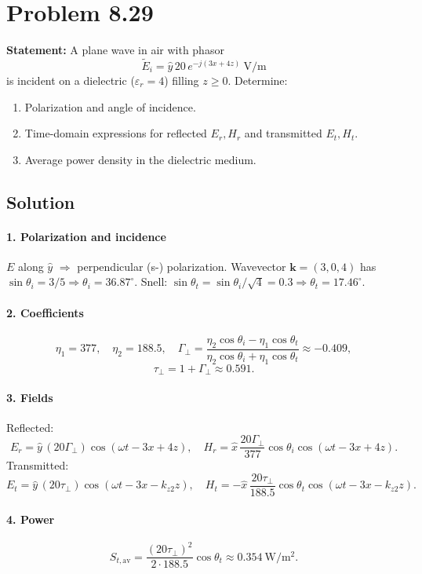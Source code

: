 \section*{Problem 8.29}
\textbf{Statement:} A plane wave in air with phasor
\[
\tilde E_i = \hat y\,20\,e^{-j(3x + 4z)}\ \mathrm{V/m}
\]
is incident on a dielectric ($\varepsilon_r=4$) filling $z\ge0$. Determine:
\begin{enumerate}
  \item Polarization and angle of incidence.
  \item Time-domain expressions for reflected $E_r,H_r$ and transmitted $E_t,H_t$.
  \item Average power density in the dielectric medium.
\end{enumerate}

\subsection*{Solution}
\paragraph{1. Polarization and incidence}
$E$ along $\hat y$ $\Rightarrow$ perpendicular (s-) polarization.  
Wavevector $\mathbf{k}=(3,0,4)$ has $\sin\theta_i=3/5\Rightarrow \theta_i=36.87^\circ$.  
Snell: $\sin\theta_t=\sin\theta_i/\sqrt{4}=0.3\Rightarrow \theta_t=17.46^\circ$.

\paragraph{2. Coefficients}
\[
\eta_1=377,\quad\eta_2=188.5,\quad
\Gamma_\perp = \frac{\eta_2\cos\theta_i - \eta_1\cos\theta_t}{\eta_2\cos\theta_i + \eta_1\cos\theta_t}\approx -0.409,
\]
\[
\tau_\perp = 1 + \Gamma_\perp \approx 0.591.
\]

\paragraph{3. Fields}
Reflected:
\[
E_r = \hat y\,(20\Gamma_\perp)\cos(\omega t - 3x + 4z),
\quad
H_r = \hat x\,\frac{20\Gamma_\perp}{377}\cos\theta_i\cos(\omega t - 3x + 4z).
\]
Transmitted:
\[
E_t = \hat y\,(20\tau_\perp)\cos(\omega t - 3x - k_{z2} z),
\quad
H_t = -\hat x\,\frac{20\tau_\perp}{188.5}\cos\theta_t\cos(\omega t - 3x - k_{z2} z).
\]

\paragraph{4. Power}
\[
S_{t,\mathrm{av}}
= \frac{(20\tau_\perp)^2}{2\cdot188.5}\cos\theta_t
\approx 0.354\ \mathrm{W/m^2}.
\]

